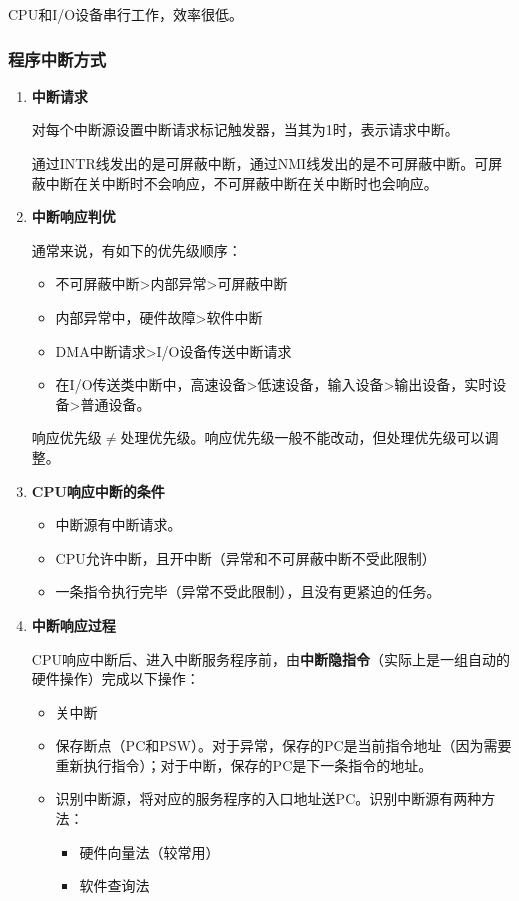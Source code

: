 \documentclass[12pt, a4paper, oneside]{ctexart}
\begin{document}
CPU和I/O设备串行工作，效率很低。

\subsubsection{程序中断方式}

\begin{enumerate}
  \item {\bf 中断请求}
  
  对每个中断源设置中断请求标记触发器，当其为1时，表示请求中断。

  通过INTR线发出的是可屏蔽中断，通过NMI线发出的是不可屏蔽中断。可屏蔽中断在关中断时不会响应，不可屏蔽中断在关中断时也会响应。

  \item {\bf 中断响应判优}
  
  通常来说，有如下的优先级顺序：
  \begin{itemize}
    \item 不可屏蔽中断>内部异常>可屏蔽中断
    \item 内部异常中，硬件故障>软件中断
    \item DMA中断请求>I/O设备传送中断请求
    \item 在I/O传送类中断中，高速设备>低速设备，输入设备>输出设备，实时设备>普通设备。
  \end{itemize}

  响应优先级$\neq$处理优先级。响应优先级一般不能改动，但处理优先级可以调整。

  \item {\bf CPU响应中断的条件}
  
  \begin{itemize}
    \item 中断源有中断请求。
    \item CPU允许中断，且开中断（异常和不可屏蔽中断不受此限制）
    \item 一条指令执行完毕（异常不受此限制），且没有更紧迫的任务。
  \end{itemize}

  \item {\bf 中断响应过程}
  
  CPU响应中断后、进入中断服务程序前，由\textbf{中断隐指令}（实际上是一组自动的硬件操作）完成以下操作：
  \begin{itemize}
    \item 关中断
    \item 保存断点（PC和PSW）。对于异常，保存的PC是当前指令地址（因为需要重新执行指令）；对于中断，保存的PC是下一条指令的地址。
    \item 识别中断源，将对应的服务程序的入口地址送PC。识别中断源有两种方法：
    \begin{itemize}
      \item 硬件向量法（较常用）
      \item 软件查询法
    \end{itemize}
  \end{itemize}


\end{enumerate}
\end{document}
